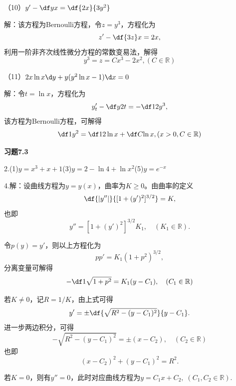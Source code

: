 （10）$y'-\df yx=\df{2x}{3y^2}$

解：该方程为Bernoulli方程，令$z=y^3$，方程化为
$$z'-\df{3z}x=2x,$$
利用一阶非齐次线性微分方程的常数变易法，解得
$$y^3=z=Cx^3-2x^2,(C\in\mathbb{R})$$

（11）$2x\ln x\d y+y(y^2\ln x-1)\d x=0$

解：令$t=\ln x$，方程化为
$$y'_t-\df y{2t}=-\df12y^3,$$
该方程为Bernoulli方程，可解得
$$\df1{y^2}=\df12\ln x+\df C{\ln x},(x>0,C\in\mathbb{R})$$

% 

{\bf 习题7.3}

\bigskip

2.\;(1)$y=x^3+x+1$\quad(3)$y=2-\ln4+\ln x^2$\quad(5)$y=e^{-x}$

\bigskip

4.\;解：设曲线方程为$y=y(x)$，曲率为$K\geq0$。由曲率的定义
$$\df{|y''|}{[1+(y')^2]^{3/2}}=K,$$
也即
$$y''=[1+(y')^2]^{3/2}K_1,\quad(K_1\in\mathbb{R}).$$

令$p(y)=y'$，则以上方程化为
$$pp'=K_1(1+p^2)^{3/2},$$
分离变量可解得
$$-\df1{\sqrt{1+p^2}}=K_1(y-C_1),\quad(C_1\in\mathbb{R})$$

若$K\ne 0$，记$R=1/K$，由上式可得
$$y'=\pm\df{\sqrt{R^2-(y-C_1)^2}}{y-C_1}.$$
进一步两边积分，可得
$$-\sqrt{R^2-(y-C_1)^2}=\pm(x-C_2),\quad(C_2\in\mathbb{R})$$
也即
$$(x-C_2)^2+(y-C_1)^2=R^2.$$

若$K=0$，则有$y''=0$，此时对应曲线方程为$y=C_1x+C_2,\;(C_1,C_2\in\mathbb{R})$.

\bigskip

